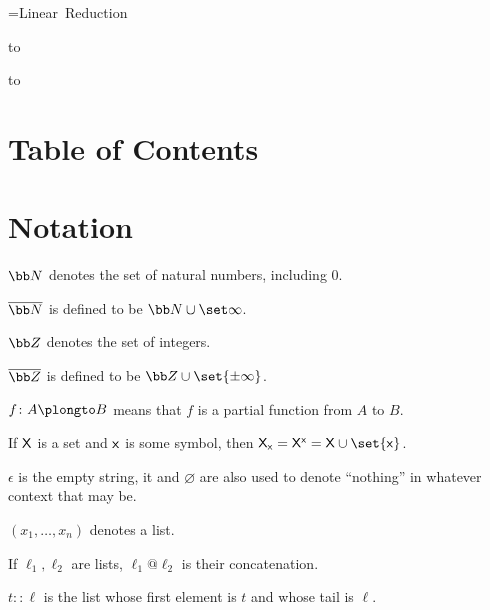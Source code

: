



{=\hbox{Linear Reduction}
\centerline{
    \vbox{
        \smallskip
        \hbox to
    }
}}

\bigskip
\hbox to

\section*{Table of Contents}

\tableofcontents

\vfill\break

\setcounter{section}{-1}
\section{Notation}

\benum
    \item ${\bb N}$ denotes the set of natural numbers, including $0$.
    \item $\overline{\bb N}$ is defined to be ${\bb N}\cup\set\infty$.
    \item ${\bb Z}$ denotes the set of integers.
    \item $\overline{\bb Z}$ is defined to be ${\bb Z}\cup\set{\pm\infty}$.
    \item $f\colon A\plongto B$ means that $f$ is a partial function from $A$ to $B$.
    \item If ${\sf X}$ is a set and ${\sf x}$ is some symbol, then ${\sf X}_{\sf x}={\sf X}^{\sf x}={\sf X}\cup\set{{\sf x}}$.
    \item $\epsilon$ is the empty string, it and $\varnothing$ are also used to denote ``nothing'' in whatever context that may be.
    \item $(x_1,\dots,x_n)$ denotes a list.
    \item If $\ell_1,\ell_2$ are lists, $\ell_1@\ell_2$ is their concatenation.
    \item $t{::}\ell$ is the list whose first element is $t$ and whose tail is $\ell$.
\eenum
\vfill\break

